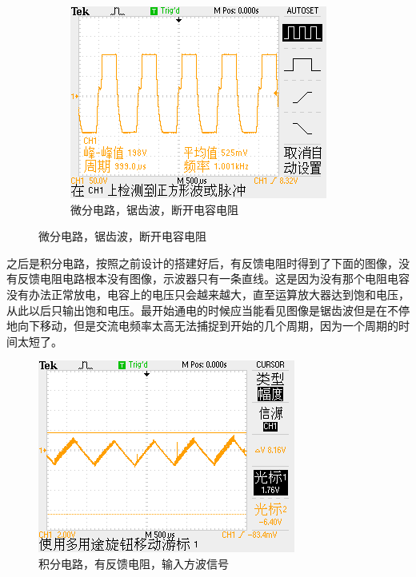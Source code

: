 \documentclass{ctexart}
\begin{document}
\begin{figure}[H]
\begin{subfigure}{.32\textwidth}
    \includegraphics[width=\linewidth]{电路图像/微分电路/输入锯齿波/三角波无电阻无电容}
    \caption{微分电路，锯齿波，断开电容电阻}
  \end{subfigure}
\end{figure}

之后是积分电路，按照之前设计的搭建好后，有反馈电阻时得到了下面的图像，没有反馈电阻电路根本没有图像，示波器只有一条直线。这是因为没有那个电阻电容没有办法正常放电，电容上的电压只会越来越大，直至运算放大器达到饱和电压，从此以后只输出饱和电压。最开始通电的时候应当能看见图像是锯齿波但是在不停地向下移动，但是交流电频率太高无法捕捉到开始的几个周期，因为一个周期的时间太短了。

\begin{figure}[H]
  \centering
  \includegraphics[width=0.75\linewidth]{电路图像/积分电路/积分电路有反馈电阻}
  \caption{积分电路，有反馈电阻，输入方波信号}
\end{figure}
\end{document}

